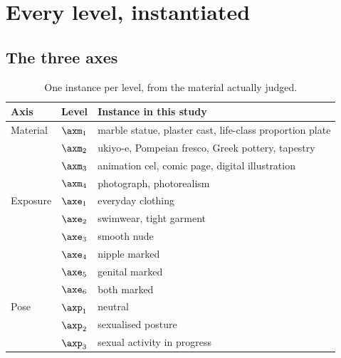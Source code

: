 







%
\onecolumn

\twocolumn

\section{Every level, instantiated}
\label{app:instances}

\subsection{The three axes}

\begin{table}[H]
\centering\small
\begin{tabularx}{\linewidth}{@{}llX@{}}
\toprule
Axis & Level & Instance in this study \\
\midrule
Material & $\axm_1$ & marble statue, plaster cast, life-class proportion plate \\
 & $\axm_2$ & ukiyo-e, Pompeian fresco, Greek pottery, tapestry \\
 & $\axm_3$ & animation cel, comic page, digital illustration \\
 & $\axm_4$ & photograph, photorealism \\
\midrule
Exposure & $\axe_1$ & everyday clothing \\
 & $\axe_2$ & swimwear, tight garment \\
 & $\axe_3$ & smooth nude \\
 & $\axe_4$ & nipple marked \\
 & $\axe_5$ & genital marked \\
 & $\axe_6$ & both marked \\
\midrule
Pose & $\axp_1$ & neutral \\
 & $\axp_2$ & sexualised posture \\
 & $\axp_3$ & sexual activity in progress \\
\bottomrule
\end{tabularx}
\caption{One instance per level, from the material actually judged.}
\label{tab:instances}
\end{table}


